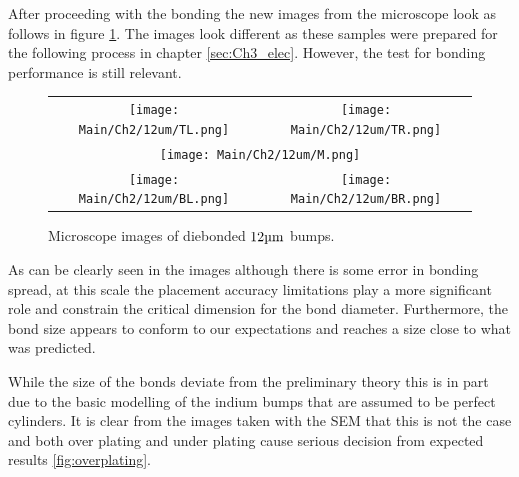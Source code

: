 After proceeding with the bonding the new images from the microscope look as follows in figure \ref{fig:12um_bumps}. The images look different as these samples were prepared for the following process in chapter \ref{sec:Ch3_elec}. However, the test for bonding performance is still relevant.


\begin{figure}
    \centering
    \def\w{0.35\textwidth}
    \begin{tabular}{cc}
        \texttt{[image: Main/Ch2/12um/TL.png]} &
        \texttt{[image: Main/Ch2/12um/TR.png]} \\
        \multicolumn{2}{c}{\texttt{[image: Main/Ch2/12um/M.png]}} \\
        \texttt{[image: Main/Ch2/12um/BL.png]} &
        \texttt{[image: Main/Ch2/12um/BR.png]}
    \end{tabular}
    \caption{Microscope images of diebonded $12 \um$ bumps.}
    \label{fig:12um_bumps}
\end{figure}



As can be clearly seen in the images although there is some error in bonding spread, at this scale the placement accuracy limitations play a more significant role and constrain the critical dimension for the bond diameter. Furthermore, the bond size appears to conform to our expectations and reaches a size close to what was predicted.

While the size of the bonds deviate from the preliminary theory this is in part due to the basic modelling of the indium bumps that are assumed to be perfect cylinders. It is clear from the images taken with the SEM that this is not the case and both over plating and under plating cause serious decision from expected results \ref{fig:overplating}.

